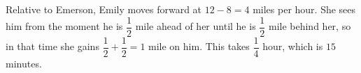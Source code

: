 Relative to Emerson, Emily moves forward at $12-8=4$ miles per hour. She sees him from the moment he is $\dfrac{1}{2}$ mile ahead of her until he is $\dfrac{1}{2}$ mile behind her, so in that time she gains $\dfrac{1}{2}+\dfrac{1}{2}=1$ mile on him. This takes $\dfrac{1}{4}$ hour, which is $\boxed{15}$ minutes.
